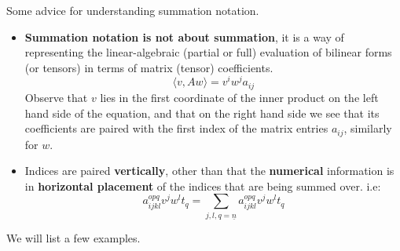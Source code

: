 \documentclass[../main-v2-manifolds.tex]{subfiles}
\begin{document}
Some advice for understanding summation notation.
\begin{itemize}
    \item \textbf{Summation notation is not about summation}, it is a way of representing the linear-algebraic (partial or full) evaluation of bilinear forms (or tensors) in terms of matrix (tensor) coefficients.
    \[
        \langle v, Aw\rangle = v^iw^ja_{ij}
    \]
    Observe that $v$ lies in the first coordinate of the inner product on the left hand side of the equation, and that on the right hand side we see that its coefficients are paired with the first index of the matrix entries $a_{ij}$, similarly for $w$.
    \item Indices are paired \textbf{vertically}, other than that the \textbf{numerical} information is in \textbf{horizontal placement} of the indices that are being summed over. i.e:
    \[
        a_{ijkl}^{opq}v^jw^lt_q=\sum_{j,l,q=\underline{n}}a_{ijkl}^{opq}v^jw^lt_q
    \]
\end{itemize}
We will list a few examples. \\
\end{document}
